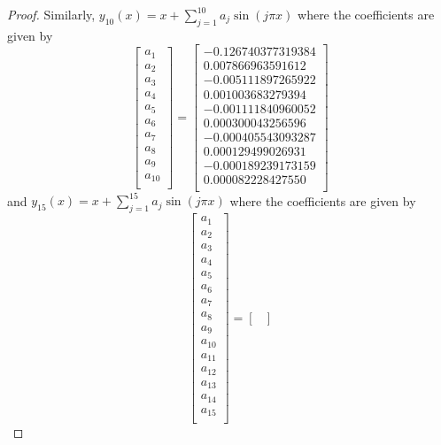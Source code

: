 \documentclass[12pt]{article}
\theoremstyle{definition}
\begin{document}
\begin{proof}
  Similarly, $y_{10}(x) = x + \sum_{j=1}^{10}a_j\sin(j\pi x)$ where the coefficients are given by
  \[
    \begin{bmatrix}
      a_1 \\
      a_2 \\
      a_3 \\
      a_4 \\
      a_5 \\
      a_6 \\
      a_7 \\
      a_8 \\
      a_9 \\
      a_{10} \\
    \end{bmatrix}
      =
    \begin{bmatrix}
      -0.126740377319384 \\
      0.007866963591612 \\
      -0.005111897265922 \\
      0.001003683279394 \\
      -0.001111840960052 \\
      0.000300043256596 \\
      -0.000405543093287 \\
      0.000129499026931 \\
      -0.000189239173159 \\
      0.000082228427550 \\
    \end{bmatrix}
  \]
  and $y_{15}(x) = x + \sum_{j=1}^{15}a_j\sin(j\pi x)$ where the coefficients are given by
  \[
    \begin{bmatrix}
      a_1 \\
      a_2 \\
      a_3 \\
      a_4 \\
      a_5 \\
      a_6 \\
      a_7 \\
      a_8 \\
      a_9 \\
      a_{10} \\
      a_{11} \\
      a_{12} \\
      a_{13} \\
      a_{14} \\
      a_{15} \\
    \end{bmatrix}
      =
    \begin{bmatrix}

\end{bmatrix}\]
\end{proof}
\end{document}
